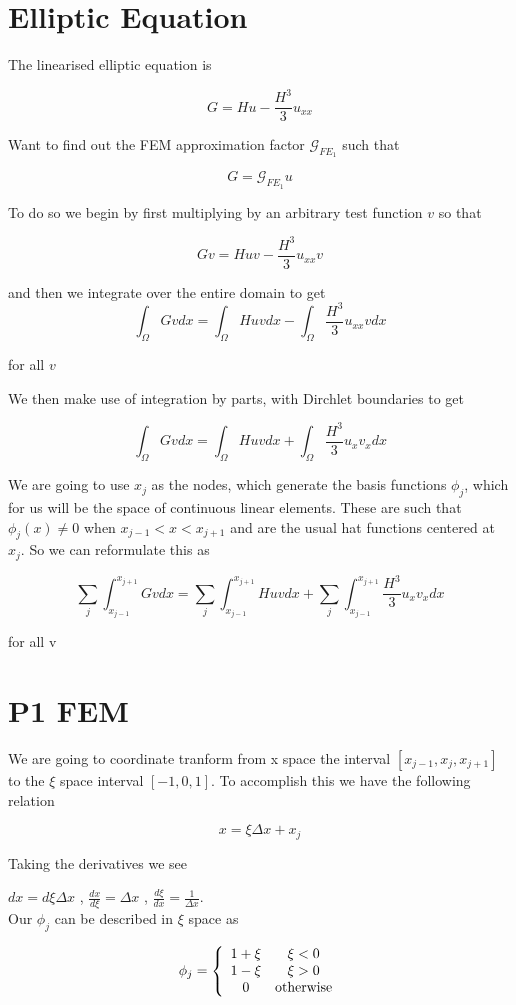 \documentclass[12pt]{article}
\begin{document}
\section{Elliptic Equation}
The linearised elliptic equation is

\[G = Hu - \frac{H^3}{3}u_{xx}\]

Want to find out the FEM approximation factor $\mathcal{G}_{FE_1}$ such that

\[G = \mathcal{G}_{FE_1} u\]

To do so we begin by first multiplying by an arbitrary test function $v$ so that

\[Gv = Huv - \frac{H^3}{3}u_{xx}v\]

and then we integrate over the entire domain to get 
\[\int_\Omega Gv dx = \int_\Omega Huv dx - \int_\Omega \frac{H^3}{3}u_{xx}vdx\]

for all $v$

We then make use of integration by parts, with Dirchlet boundaries to get

\[\int_\Omega Gv dx = \int_\Omega Huv dx + \int_\Omega \frac{H^3}{3}u_{x}v_xdx\]

We are going to use $x_j$ as the nodes, which generate the basis functions $\phi_j$, which for us will be the space of continuous linear elements. These are such that $\phi_j(x) \neq 0$ when $x_{j-1} < x< x_{j+1}$ and are the usual hat functions centered at $x_j$.
So we can reformulate this as 

\[\sum_{j}\int_{x_{j-1}}^{x_{j+1}} Gv dx = \sum_{j}\int_{x_{j-1}}^{x_{j+1}}  Huv dx + \sum_{j}\int_{x_{j-1}}^{x_{j+1}}  \frac{H^3}{3}u_{x}v_{x}dx\]


for all v

\section{P1 FEM}
We are going to coordinate tranform from x space the interval $[x_{j-1},x_{j} ,x_{j+1}]$ to the $\xi$ space interval $[-1,0,1]$. To accomplish this we have the following relation

$$x = \xi\Delta x + x_{j}$$

Taking the derivatives we see


$dx = d\xi\Delta x$ , $\frac{dx}{d\xi} = \Delta x$ , $\frac{d\xi}{dx} = \frac{1}{\Delta x}$. \\

Our $\phi_j$ can be described in $\xi$ space as

\begin{equation}
\phi_j = \left\lbrace \begin{array}{c c}
1 + \xi & \xi < 0 \\
1 - \xi & \xi > 0\\
0 & \text{otherwise}
\end{array} 
\right.
\end{equation}
\end{document}

